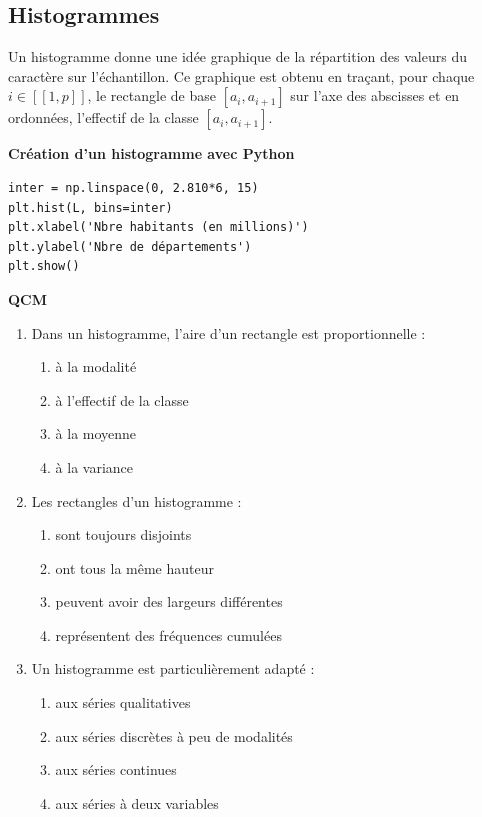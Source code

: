 \documentclass[../PolyS4.tex]{subfiles}
\begin{document}
\subsection{Histogrammes}

Un histogramme donne une idée graphique de la répartition des valeurs du caractère sur l'échantillon. Ce graphique est obtenu en traçant, pour chaque $i \in [[1, p]]$, le rectangle de base $[a_i, a_{i+1}]$ sur l'axe des abscisses et en ordonnées, l'effectif de la classe $[a_i, a_{i+1}]$.

\begin{Meth}\textbf{Création d'un histogramme avec Python}\\

\begin{verbatim}
inter = np.linspace(0, 2.810*6, 15)
plt.hist(L, bins=inter)
plt.xlabel('Nbre habitants (en millions)')
plt.ylabel('Nbre de départements')
plt.show()
\end{verbatim}
\end{Meth}

\textbf{QCM}

\begin{enumerate}
\item Dans un histogramme, l'aire d'un rectangle est proportionnelle :
\begin{enumerate}
\item à la modalité
\item à l'effectif de la classe
\item à la moyenne
\item à la variance
\end{enumerate}

\item Les rectangles d'un histogramme :
\begin{enumerate}
\item sont toujours disjoints
\item ont tous la même hauteur
\item peuvent avoir des largeurs différentes
\item représentent des fréquences cumulées
\end{enumerate}

\item Un histogramme est particulièrement adapté :
\begin{enumerate}
\item aux séries qualitatives
\item aux séries discrètes à peu de modalités
\item aux séries continues
\item aux séries à deux variables
\end{enumerate}
\end{enumerate}
\end{document}
